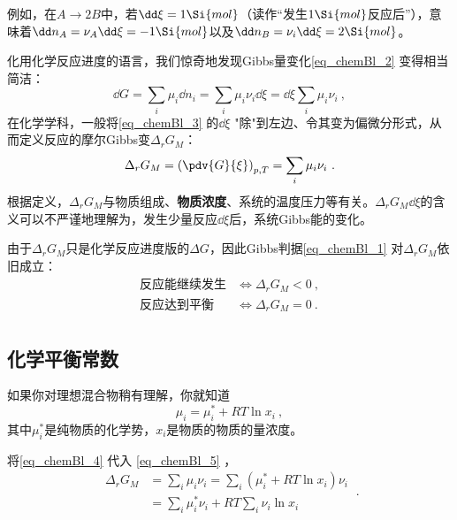 例如，在$A\to2B$中，若$\dd \xi=1 \Si{mol}$（读作“发生$1 \Si{mol}$反应后”），意味着$\dd n_A = \nu_A \dd \xi = - 1 \Si{mol}$以及$\dd n_B = \nu_i \dd \xi = 2 \Si{mol}$。

化用化学反应进度的语言，我们惊奇地发现Gibbs量变化\autoref{eq_chemBl_2} 变得相当简洁：
\begin{equation}\label{eq_chemBl_3}
\dd G = \sum_i \mu_i \dd n_i = \sum_i \mu_i \nu_i \dd \xi =  \dd \xi \sum_i \mu_i \nu_i~,
\end{equation}
在化学学科，一般将\autoref{eq_chemBl_3} 的$\dd \xi$ "除"到左边、令其变为偏微分形式，从而定义反应的摩尔Gibbs变$\Delta_r G_M$：
\begin{equation} \label{eq_chemBl_5}
\Delta_r G_M = \left(\pdv{G}{\xi}\right)_{p,T} = \sum_i \mu_i \nu_i~.
\end{equation}
根据定义，$\Delta_r G_M$与物质组成、\textbf{物质浓度}、系统的温度压力等有关。$\Delta_r G_M \dd \xi$的含义可以不严谨地理解为，发生少量反应$\dd \xi$后，系统Gibbs能的变化。

由于$\Delta_r G_M$只是化学反应进度版的$\Delta G$，因此Gibbs判据\autoref{eq_chemBl_1} 对$\Delta_r G_M$依旧成立：
\begin{equation}\label{eq_chemBl_6}
\begin{aligned}
\text{反应能继续发生} &\Longleftrightarrow \Delta_r G_M < 0~,\\
\text{反应达到平衡} &\Longleftrightarrow \Delta_r G_M = 0~.\\
\end{aligned}
\end{equation}

\subsection{化学平衡常数}
如果你对理想混合物稍有理解，你就知道
\begin{equation}\label{eq_chemBl_4}
\mu_i = \mu_i^* + RT \ln x_i~,
\end{equation}
其中$\mu_i^*$是纯物质的化学势，$x_i$是物质的物质的量浓度。

将\autoref{eq_chemBl_4} 代入 \autoref{eq_chemBl_5} ，
\begin{equation}
\begin{aligned}
\Delta_r G_M &= \sum_i \mu_i \nu_i = \sum_i (\mu_i^* + RT \ln x_i) \nu_i\\
&= \sum_i \mu_i^* \nu_i + RT \sum_i \nu_i \ln x_i
\end{aligned}~.
\end{equation}

